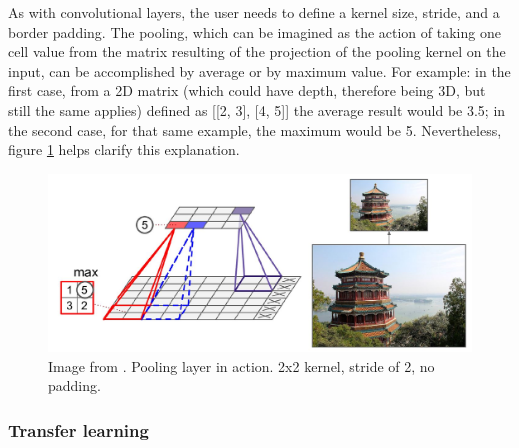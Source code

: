 \documentclass[../main.tex]{subfiles}
\begin{document}
As with convolutional layers, the user needs to define a kernel size, stride, and a border padding. The pooling, which can be imagined as the action of taking one cell value from the matrix resulting of the projection of the pooling kernel on the input, can be accomplished by average or by maximum value. For example: in the first case, from a 2D matrix (which could have depth, therefore being 3D, but still the same applies) defined as [[2, 3], [4, 5]] the average result would be 3.5; in the second case, for that same example, the maximum would be 5. Nevertheless, figure \ref{fig:pooling_example} helps clarify this explanation.

\begin{figure}[H]
    \centering
    \includegraphics[width=0.8\linewidth]{images/pooling_example.JPG}
    \caption{Image from \cite{hands_on_ML_Aurelien}. Pooling layer in action. 2x2 kernel, stride of 2, no padding.}
    \label{fig:pooling_example}
\end{figure}

\subsubsection{Transfer learning}
\end{document}
